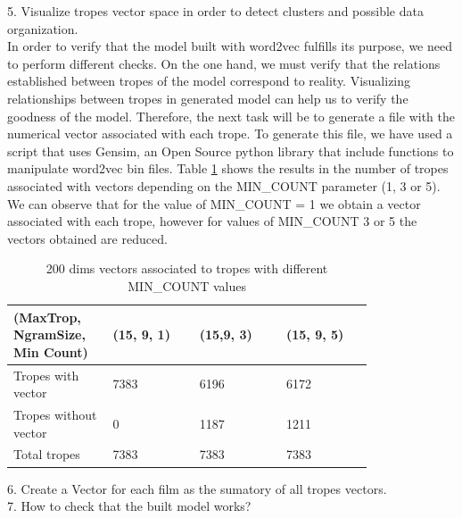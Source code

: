 \documentclass[letterpaper]{article}
\begin{document}
	
	5. Visualize tropes vector space in order to detect clusters and possible data organization. \\
	In order to verify that the model built with word2vec fulfills its purpose, we need to perform different checks. On the one hand, 
	we must verify that the relations established between tropes of the model correspond to reality. 
	Visualizing relationships between tropes in generated model can help us to verify the goodness of the model.
	Therefore, the next task will be to generate a file with the numerical vector associated with each trope. 
	To generate this file, we have used a script that uses Gensim, an Open Source python library that include functions to manipulate
	word2vec bin files.
	Table \ref{tab:200dims-vectors-associated-to-tropes} shows the results in the number of tropes associated with vectors depending 
	on the MIN\_COUNT parameter (1, 3 or 5). We can observe that for the value of MIN\_COUNT = 1 we obtain a vector associated with each trope, 
	however for values of MIN\_COUNT 3 or 5 the vectors obtained are reduced. 
	\begin{table}[t]
		\centering
		\begin{tabular}{|p{0.20\linewidth}|p{0.2\linewidth}|p{0.2\linewidth}|p{0.2\linewidth}|}
			\hline
			\textbf{(MaxTrop, NgramSize, Min Count)}& \textbf{(15, 9, 1)} & \textbf{(15,9, 3)} & \textbf{(15, 9, 5)}\\
			\hline
			\hline
			Tropes with vector&7383  & 6196 & 6172 \\
			\hline
			Tropes without vector& 0 & 1187 & 1211 \\
			\hline
			Total tropes&7383&7383&7383\\
			\hline
			
		\end{tabular}
		\caption{200 dims vectors associated to tropes with different MIN\_COUNT values}
		\label{tab:200dims-vectors-associated-to-tropes}
	\end{table}	
	
	6. Create a Vector for each film as the sumatory of all tropes vectors. \\
	
	7. How to check that the built model works?
	
\end{document}
